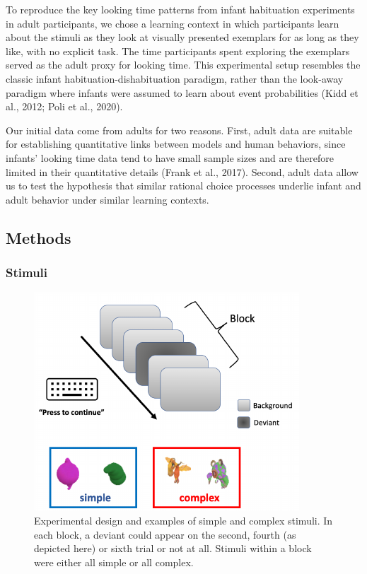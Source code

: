 \documentclass[10pt, letterpaper]{article}
\newenvironment{CodeChunk}{}{}
\begin{document}
To reproduce the key looking time patterns from infant habituation
experiments in adult participants, we chose a learning context in which
participants learn about the stimuli as they look at visually presented
exemplars for as long as they like, with no explicit task. The time
participants spent exploring the exemplars served as the adult proxy for
looking time. This experimental setup resembles the classic infant
habituation-dishabituation paradigm, rather than the look-away paradigm
where infants were assumed to learn about event probabilities (Kidd et
al., 2012; Poli et al., 2020).

Our initial data come from adults for two reasons. First, adult data are
suitable for establishing quantitative links between models and human
behaviors, since infants' looking time data tend to have small sample
sizes and are therefore limited in their quantitative details (Frank et
al., 2017). Second, adult data allow us to test the hypothesis that
similar rational choice processes underlie infant and adult behavior
under similar learning contexts.

\hypertarget{methods}{%
\subsection{Methods}\label{methods}}

\hypertarget{stimuli}{%
\subsubsection{Stimuli}\label{stimuli}}

\begin{CodeChunk}
\begin{figure}[h]

{\centering \includegraphics{figs/experimental_design-1} 

}

\caption[Experimental design and examples of simple and complex stimuli]{Experimental design and examples of simple and complex stimuli. In each block, a deviant could appear on the second, fourth (as depicted here) or sixth trial or not at all. Stimuli within a block were either all simple or all complex.}\label{fig:experimental_design}
\end{figure}
\end{CodeChunk}
\end{document}
